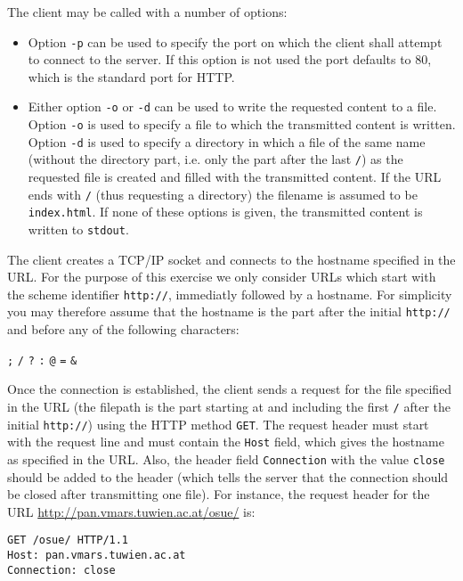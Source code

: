 \vspace{-3mm}

The client may be called with a number of options:
\begin{itemize}
\item Option \texttt{-p} can be used to specify the port
on which the client shall attempt to connect to the server.
If this option is not used the port defaults to 80,
which is the standard port for HTTP.
\item Either option \texttt{-o} or \texttt{-d} can be used
to write the requested content to a file.
Option \texttt{-o} is used to specify a file
to which the transmitted content is written.
Option \texttt{-d} is used to specify a directory
in which a file of the same name
(without the directory part, i.e. only the part after the last \verb|/|)
as the requested file is created
and filled with the transmitted content.
If the URL ends with \verb|/| (thus requesting a directory)
the filename is assumed to be \verb|index.html|.
If none of these options is given,
the transmitted content is written to \verb|stdout|.
\end{itemize}

The client creates a TCP/IP socket
and connects to the hostname specified in the URL.
For the purpose of this exercise we only consider URLs
which start with the scheme identifier \verb|http://|,
immediatly followed by a hostname.
For simplicity you may therefore assume that
the hostname is the part after the initial \verb|http://|
and before any of the following characters:

\texttt{;} \texttt{/} \texttt{?} \texttt{:} \texttt{@} \texttt{=} \texttt{\&}

Once the connection is established,
the client sends a request for the file specified in the URL
(the filepath is the part starting at and including the first \texttt{/}
after the initial \verb|http://|)
using the HTTP method \texttt{GET}.
The request header must start with the request line
and must contain the \texttt{Host} field,
which gives the hostname as specified in the URL.
Also, the header field \verb|Connection| with the value \verb|close|
should be added to the header
(which tells the server that the connection should be closed after transmitting one file).
For instance, the request header for the URL
\url{http://pan.vmars.tuwien.ac.at/osue/} is:

\begin{verbatim}
GET /osue/ HTTP/1.1
Host: pan.vmars.tuwien.ac.at
Connection: close
\end{verbatim}

